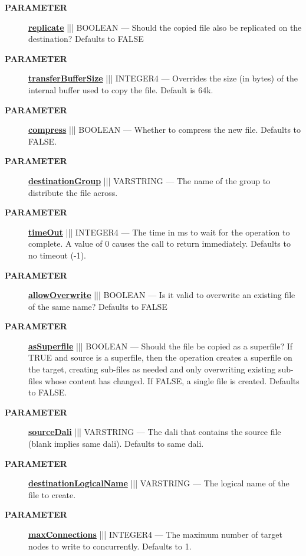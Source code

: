 \par
\begin{description}
\item [\colorbox{tagtype}{\color{white} \textbf{\textsf{PARAMETER}}}] \textbf{\underline{replicate}} ||| BOOLEAN --- Should the copied file also be replicated on the destination? Defaults to FALSE
\item [\colorbox{tagtype}{\color{white} \textbf{\textsf{PARAMETER}}}] \textbf{\underline{transferBufferSize}} ||| INTEGER4 --- Overrides the size (in bytes) of the internal buffer used to copy the file. Default is 64k.
\item [\colorbox{tagtype}{\color{white} \textbf{\textsf{PARAMETER}}}] \textbf{\underline{compress}} ||| BOOLEAN --- Whether to compress the new file. Defaults to FALSE.
\item [\colorbox{tagtype}{\color{white} \textbf{\textsf{PARAMETER}}}] \textbf{\underline{destinationGroup}} ||| VARSTRING --- The name of the group to distribute the file across.
\item [\colorbox{tagtype}{\color{white} \textbf{\textsf{PARAMETER}}}] \textbf{\underline{timeOut}} ||| INTEGER4 --- The time in ms to wait for the operation to complete. A value of 0 causes the call to return immediately. Defaults to no timeout (-1).
\item [\colorbox{tagtype}{\color{white} \textbf{\textsf{PARAMETER}}}] \textbf{\underline{allowOverwrite}} ||| BOOLEAN --- Is it valid to overwrite an existing file of the same name? Defaults to FALSE
\item [\colorbox{tagtype}{\color{white} \textbf{\textsf{PARAMETER}}}] \textbf{\underline{asSuperfile}} ||| BOOLEAN --- Should the file be copied as a superfile? If TRUE and source is a superfile, then the operation creates a superfile on the target, creating sub-files as needed and only overwriting existing sub-files whose content has changed. If FALSE, a single file is created. Defaults to FALSE.
\item [\colorbox{tagtype}{\color{white} \textbf{\textsf{PARAMETER}}}] \textbf{\underline{sourceDali}} ||| VARSTRING --- The dali that contains the source file (blank implies same dali). Defaults to same dali.
\item [\colorbox{tagtype}{\color{white} \textbf{\textsf{PARAMETER}}}] \textbf{\underline{destinationLogicalName}} ||| VARSTRING --- The logical name of the file to create.
\item [\colorbox{tagtype}{\color{white} \textbf{\textsf{PARAMETER}}}] \textbf{\underline{maxConnections}} ||| INTEGER4 --- The maximum number of target nodes to write to concurrently. Defaults to 1.

\end{description}
